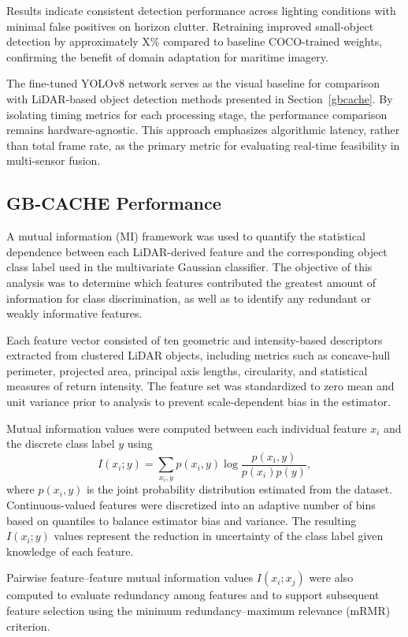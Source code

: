 \documentclass{erauthesis}
\begin{document}
Results indicate consistent detection performance across lighting conditions with minimal false positives on horizon clutter.
Retraining improved small-object detection by approximately X\% compared to baseline COCO-trained weights, confirming the benefit of domain adaptation for maritime imagery.


The fine-tuned YOLOv8 network serves as the visual baseline for comparison with LiDAR-based object detection methods presented in Section~\ref{gbcache}.
By isolating timing metrics for each processing stage, the performance comparison remains hardware-agnostic.
This approach emphasizes algorithmic latency, rather than total frame rate, as the primary metric for evaluating real-time feasibility in multi-sensor fusion.

\subsection{GB-CACHE Performance} \label{performance_gbcache}

A mutual information (MI) framework was used to quantify the statistical dependence between each LiDAR-derived feature and the corresponding object class label used in the multivariate Gaussian classifier. 
The objective of this analysis was to determine which features contributed the greatest amount of information for class discrimination, as well as to identify any redundant or weakly informative features.

Each feature vector consisted of ten geometric and intensity-based descriptors extracted from clustered LiDAR objects, including metrics such as concave-hull perimeter, projected area, principal axis lengths, circularity, and statistical measures of return intensity. 
The feature set was standardized to zero mean and unit variance prior to analysis to prevent scale-dependent bias in the estimator.

Mutual information values were computed between each individual feature $x_i$ and the discrete class label $y$ using
\[
I(x_i; y) = \sum_{x_i,y} p(x_i, y) \log \frac{p(x_i, y)}{p(x_i) p(y)},
\]
where $p(x_i, y)$ is the joint probability distribution estimated from the dataset.
Continuous-valued features were discretized into an adaptive number of bins based on quantiles to balance estimator bias and variance.
The resulting $I(x_i; y)$ values represent the reduction in uncertainty of the class label given knowledge of each feature.

Pairwise feature–feature mutual information values $I(x_i; x_j)$ were also computed to evaluate redundancy among features and to support subsequent feature selection using the minimum redundancy–maximum relevance (mRMR) criterion.
\end{document}
